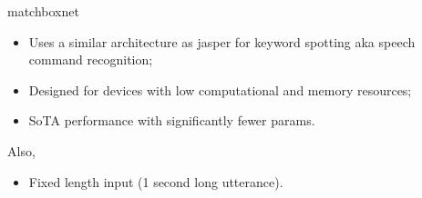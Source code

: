 \documentclass[aspectratio=169,xcolor={dvipsnames,svgnames}]{beamer}
\begin{document}
\begin{frame}[label={sec:org39d11e0}]{matchboxnet}
\begin{itemize}
\item Uses a similar architecture as jasper for keyword
spotting aka speech command recognition;

\item Designed for devices with low computational and
memory resources;

\item SoTA performance with significantly fewer params.
\end{itemize}

Also,

\begin{itemize}
\item Fixed length input (1 second long utterance).
\end{itemize}
\end{frame}
\end{document}

